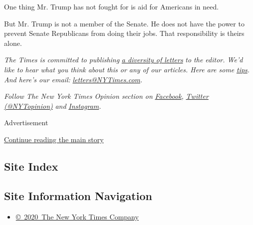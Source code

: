 One thing Mr. Trump has not fought for is aid for Americans in need.

But Mr. Trump is not a member of the Senate. He does not have the power
to prevent Senate Republicans from doing their jobs. That responsibility
is theirs alone.

\emph{The Times is committed to publishing}
\href{https://www.nytimes3xbfgragh.onion/2019/01/31/opinion/letters/letters-to-editor-new-york-times-women.html}{\emph{a
diversity of letters}} \emph{to the editor. We'd like to hear what you
think about this or any of our articles. Here are some}
\href{https://help.nytimes3xbfgragh.onion/hc/en-us/articles/115014925288-How-to-submit-a-letter-to-the-editor}{\emph{tips}}\emph{.
And here's our email:}
\href{mailto:letters@NYTimes.com}{\emph{letters@NYTimes.com}}\emph{.}

\emph{Follow The New York Times Opinion section on}
\href{https://www.facebookcorewwwi.onion/nytopinion}{\emph{Facebook}}\emph{,}
\href{http://twitter.com/NYTOpinion}{\emph{Twitter (@NYTopinion)}}
\emph{and}
\href{https://www.instagram.com/nytopinion/}{\emph{Instagram}}\emph{.}

Advertisement

\protect\hyperlink{after-bottom}{Continue reading the main story}

\hypertarget{site-index}{%
\subsection{Site Index}\label{site-index}}

\hypertarget{site-information-navigation}{%
\subsection{Site Information
Navigation}\label{site-information-navigation}}

\begin{itemize}
\tightlist
\item
  \href{https://help.nytimes3xbfgragh.onion/hc/en-us/articles/115014792127-Copyright-notice}{©~2020~The
  New York Times Company}
\end{itemize}

